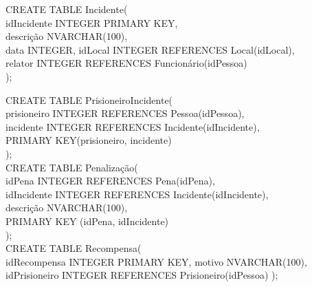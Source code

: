 \documentclass{article}
\begin{document}
CREATE TABLE Incidente(\\
idIncidente 	INTEGER PRIMARY KEY,\\
descrição	NVARCHAR(100),\\
data		INTEGER,
idLocal		INTEGER REFERENCES Local(idLocal),\\
relator		INTEGER REFERENCES Funcionário(idPessoa)\\
);

CREATE TABLE PrisioneiroIncidente(\\
prisioneiro	INTEGER REFERENCES Pessoa(idPessoa),\\
incidente	INTEGER REFERENCES Incidente(idIncidente),\\
PRIMARY KEY(prisioneiro, incidente)\\
);\\
\newpage
CREATE TABLE Penalização(\\
idPena 		INTEGER REFERENCES Pena(idPena),\\
idIncidente	INTEGER REFERENCES Incidente(idIncidente),\\
descrição	NVARCHAR(100),\\
PRIMARY KEY (idPena, idIncidente)\\
);\\

CREATE TABLE Recompensa(\\
idRecompensa	INTEGER PRIMARY KEY,
motivo 		NVARCHAR(100),
idPrisioneiro	INTEGER REFERENCES Prisioneiro(idPessoa)
);





	
\end{document}
